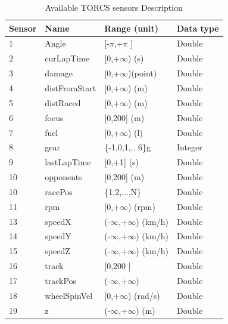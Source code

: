 \documentclass{llncs}
\begin{document}
\begin{table}[h!]
	
	\begin{tabular}{|p{2cm}|p{3cm}|p{3 cm}|p{4 cm}|}
		\hline
		{\textbf{Sensor} }&
		{\textbf{Name} }&
		{\textbf{Range} (unit)} &  
		{\textbf{Data type}}\\ 
		\hline
		1 & Angle & [-$\pi$,+$\pi$ ] & Double\\ 
		\hline
		2 & curLapTime & [0,+$\infty$) (s)	& Double\\ 
		\hline 
		3 & damage & [0,+$\infty$)(point)& Double\\ 
		\hline 
		4 & distFromStart & [0,+$\infty$) (m)& Double \\ 
		\hline 
		5 & distRaced &[0,+$\infty$) (m)& Double\\
		\hline 
		
		6 & focus & [0,200] (m)& Double\\
		\hline 
		
		7 & fuel & [0,+$\infty$) (l)& Double\\
		
		\hline
		8 & gear & \{-1,0,1,.. 6\}g& Integer \\
		
		\hline
		9 & lastLapTime &[0,+1] (s) & Double \\
		
		\hline
		10 & opponents &[0,200] (m)& Double \\
		
		\hline
		10 & racePos & \{1,2,...,N\} & Double \\
		\hline
		11 & rpm    & [0,+$\infty$) (rpm)   & Double \\
		\hline  
		13 & speedX & (-$\infty$,+$\infty$) (km/h) & Double\\
		\hline  
		14 & speedY &(-$\infty$,+$\infty$) (km/h)  & Double\\
		\hline 
		15 & speedZ & (-$\infty$,+$\infty$) (km/h) & Double \\
		
		\hline
		16 & track &  [0,200 ] & Double\\ 
		\hline
		17 & trackPos & (-$\infty$,+$\infty$) & Double\\
		
		\hline
		
		18 & wheelSpinVel  & [0,+$\infty$) (rad/s) & Double\\
		
		\hline
		19 & z &  (-$\infty$,+$\infty$) (m) & Double\\
		
		\hline
		
	\end{tabular}
	\caption{Available TORCS sensors Description}
	\label{t1}
\end{table}
\newpage	
\end{document}
